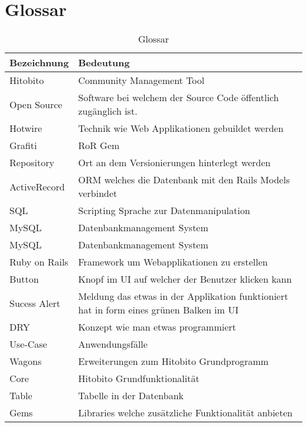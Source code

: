 \chapter{Glossar}

\begin{table}[H]
    \begin{tabular}{|L{0.3\textwidth}|L{0.6\textwidth}|}
        \hline
         \textbf{\color{white}Bezeichnung} & \textbf{\color{white}Bedeutung} \\[12pt]
        \hline
        Hitobito & Community Management Tool \\
        Open Source & Software bei welchem der Source Code öffentlich zugänglich ist. \\
        Hotwire & Technik wie Web Applikationen gebuildet werden  \\
        Grafiti & RoR Gem \\
        Repository & Ort an dem Versionierungen hinterlegt werden \\
        ActiveRecord & ORM welches die Datenbank mit den Rails Models verbindet \\
        SQL & Scripting Sprache zur Datenmanipulation \\
        MySQL & Datenbankmanagement System \\
        MySQL & Datenbankmanagement System \\
        Ruby on Rails & Framework um Webapplikationen zu erstellen \\
        Button & Knopf im UI auf welcher der Benutzer klicken kann \\
        Sucess Alert & Meldung das etwas in der Applikation funktioniert hat in form eines grünen Balken im UI \\
        DRY & Konzept wie man etwas programmiert \\
        Use-Case & Anwendungsfälle \\
        Wagons & Erweiterungen zum Hitobito Grundprogramm \\
        Core & Hitobito Grundfunktionalität \\
        Table & Tabelle in der Datenbank \\
        Gems & Libraries welche zusätzliche Funktionalität anbieten \\
        \hline
    \end{tabular}
    \caption{Glossar}
\end{table}

